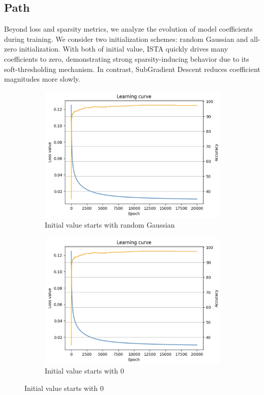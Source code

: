 \documentclass[11pt]{article}
\begin{document}
\subsection{Path}
Beyond loss and sparsity metrics, we analyze the evolution of model coefficients during training.
We consider two initialization schemes: random Gaussian and all-zero initialization. With both of initial value, ISTA quickly drives many coefficients to zero, demonstrating strong sparsity-inducing behavior due to its soft-thresholding mechanism. In contrast, SubGradient Descent reduces coefficient magnitudes more slowly.
\begin{figure}[H]
    \centering
    \begin{subfigure}[b]{0.45\textwidth}
        \includegraphics[width=\textwidth]{figures/fig1.png}
        \caption{Initial value starts with random Gaussian}
        \label{fig:sub1}
    \end{subfigure}
    \hfill
    \begin{subfigure}[b]{0.45\textwidth}
        \includegraphics[width=\textwidth]{figures/fig1.png}
        \caption{Initial value starts with 0}
        \label{fig:sub2}
    \end{subfigure}
    \label{fig:main}
\end{figure}
\end{document}
